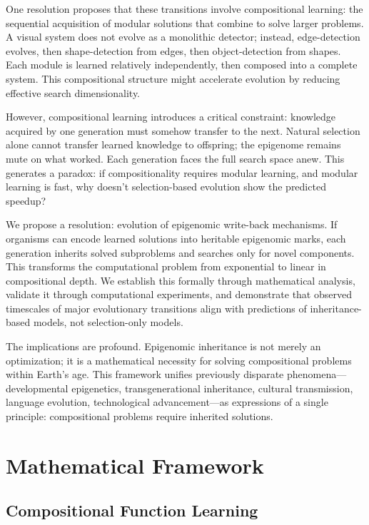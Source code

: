 \documentclass[11pt]{article}
\theoremstyle{definition}
\begin{document}
One resolution proposes that these transitions involve compositional learning: the sequential acquisition of modular solutions that combine to solve larger problems. A visual system does not evolve as a monolithic detector; instead, edge-detection evolves, then shape-detection from edges, then object-detection from shapes. Each module is learned relatively independently, then composed into a complete system. This compositional structure might accelerate evolution by reducing effective search dimensionality.

However, compositional learning introduces a critical constraint: knowledge acquired by one generation must somehow transfer to the next. Natural selection alone cannot transfer learned knowledge to offspring; the epigenome remains mute on what worked. Each generation faces the full search space anew. This generates a paradox: if compositionality requires modular learning, and modular learning is fast, why doesn't selection-based evolution show the predicted speedup?

We propose a resolution: evolution of epigenomic write-back mechanisms. If organisms can encode learned solutions into heritable epigenomic marks, each generation inherits solved subproblems and searches only for novel components. This transforms the computational problem from exponential to linear in compositional depth. We establish this formally through mathematical analysis, validate it through computational experiments, and demonstrate that observed timescales of major evolutionary transitions align with predictions of inheritance-based models, not selection-only models.

The implications are profound. Epigenomic inheritance is not merely an optimization; it is a mathematical necessity for solving compositional problems within Earth's age. This framework unifies previously disparate phenomena---developmental epigenetics, transgenerational inheritance, cultural transmission, language evolution, technological advancement---as expressions of a single principle: compositional problems require inherited solutions.

\section{Mathematical Framework}

\subsection{Compositional Function Learning}
\end{document}
